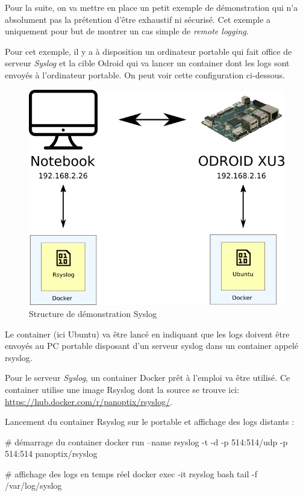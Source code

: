\documentclass[11pt,a4paper,oneside]{report}
\begin{document}
Pour la suite, on va mettre en place un petit exemple de démonstration qui n'a absolument pas la prétention d'être exhaustif ni sécurisé. Cet exemple a uniquement pour but de montrer un cas simple de \textit{remote logging}.

Pour cet exemple, il y a à disposition un ordinateur portable qui fait office de serveur \textit{Syslog} et la cible Odroid qui va lancer un container dont les logs sont envoyés à l'ordinateur portable. On peut voir cette configuration ci-dessous.

\begin{figure}[H]
\centering
\includegraphics[scale=0.7]{img/docker_syslog.png}
\caption{Structure de démonstration Syslog}
\end{figure}

Le container (ici Ubuntu) va être lancé en indiquant que les logs doivent être envoyés au PC portable disposant d'un serveur syslog dans un container appelé rsyslog.

Pour le serveur \textit{Syslog}, un container Docker prêt à l'emploi va être utilisé. Ce container utilise une image Rsyslog dont la source se trouve ici: \url{https://hub.docker.com/r/panoptix/rsyslog/}.

Lancement du container Rsyslog sur le portable et affichage des logs distants :
\begin{bashcode}
# démarrage du container
docker run --name rsyslog -t -d -p 514:514/udp -p 514:514 panoptix/rsyslog

# affichage des logs en temps réel
docker exec -it rsyslog bash
tail -f /var/log/syslog
\end{bashcode}
\end{document}

